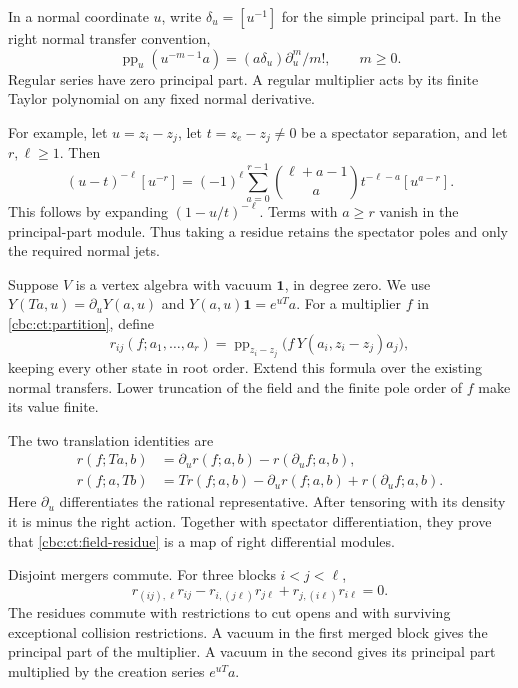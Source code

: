 In a normal coordinate $u$, write $\delta_u=[u^{-1}]$ for the
simple principal part. In the right normal transfer convention,
\begin{equation}\label{cbc:ct:normal}
 \operatorname{pp}_u(u^{-m-1}a)
       =(a\delta_u)\partial_u^m/m!,\qquad m\geq0.
\end{equation}
Regular series have zero principal part. A regular multiplier acts
by its finite Taylor polynomial on any fixed normal derivative.

For example, let $u=z_i-z_j$, let $t=z_e-z_j\ne0$ be a
spectator separation, and let $r,\ell\geq1$. Then
\begin{equation}\label{cbc:ct:spectator}
 (u-t)^{-\ell}[u^{-r}]
  =(-1)^\ell\sum_{a=0}^{r-1}
      \binom{\ell+a-1}{a}t^{-\ell-a}[u^{a-r}].
\end{equation}
This follows by expanding $(1-u/t)^{-\ell}$. Terms with
$a\geq r$ vanish in the principal-part module. Thus taking a
residue retains the spectator poles and only the required normal
jets.

Suppose $V$ is a vertex algebra with vacuum $\mathbf1$, in degree
zero. We use $Y(Ta,u)=\partial_uY(a,u)$ and
$Y(a,u)\mathbf1=e^{uT}a$. For a multiplier $f$ in
\eqref{cbc:ct:partition}, define
\begin{equation}\label{cbc:ct:field-residue}
 r_{ij}(f;a_1,\ldots,a_r)
   =\operatorname{pp}_{z_i-z_j}
       \bigl(f\,Y(a_i,z_i-z_j)a_j\bigr),
\end{equation}
keeping every other state in root order. Extend this formula over
the existing normal transfers. Lower truncation of the field and
the finite pole order of $f$ make its value finite.

The two
translation identities are
\begin{align*}
 r(f;Ta,b)&=\partial_u r(f;a,b)-r(\partial_u f;a,b),\\
 r(f;a,Tb)&=T r(f;a,b)-\partial_u r(f;a,b)
                                      +r(\partial_u f;a,b).
\end{align*}
Here $\partial_u$ differentiates the rational representative.
After tensoring with its density it is minus the right action.
Together with spectator differentiation, they prove that
\eqref{cbc:ct:field-residue} is a map of right differential modules.

\begin{proposition}\label{cbc:ct:relations}
Disjoint mergers commute. For three blocks $i<j<\ell$,
\begin{equation}\label{cbc:ct:three}
 r_{(ij),\ell}r_{ij}-r_{i,(j\ell)}r_{j\ell}
                         +r_{j,(i\ell)}r_{i\ell}=0.
\end{equation}
The residues commute with restrictions to cut opens and with
surviving exceptional collision restrictions. A vacuum in the
first merged block gives the principal part of the multiplier.
A vacuum in the second gives its principal part multiplied by
the creation series $e^{uT}a$.
\end{proposition}

